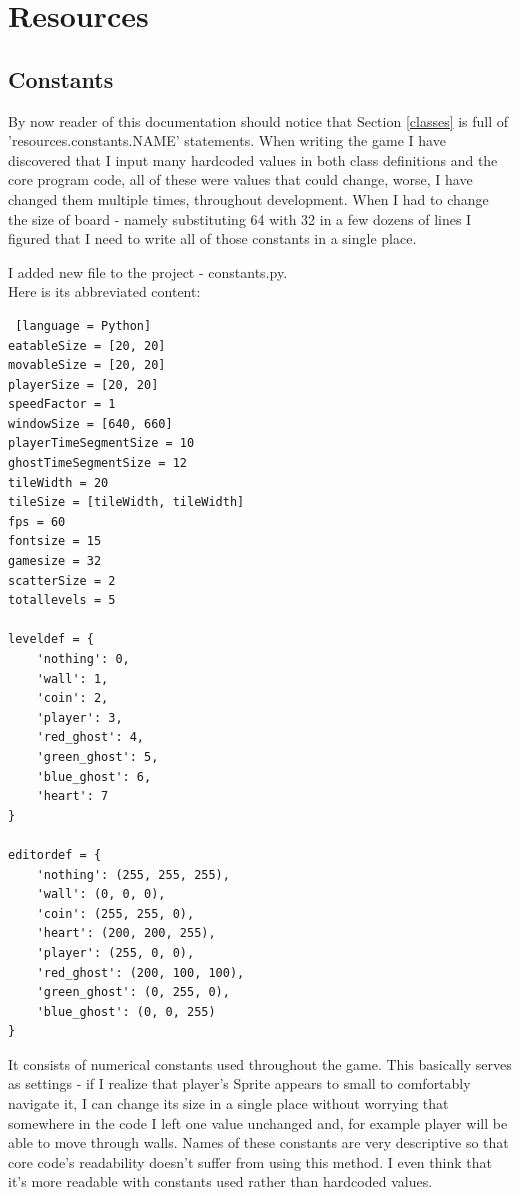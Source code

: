 \documentclass[11pt,a4paper,notitlepage]{report}
\newcommand{\dsubsection}[1]{\FloatBarrier \subsection{#1}}
\begin{document}
		\section{Resources}
			\label{resources}
			\dsubsection{Constants}
				\label{constants}
				By now reader of this documentation should notice that Section \ref{classes} is full of 'resources.constants.NAME' statements. When writing the game I have discovered that I input many hardcoded values in both class definitions and the core program code, all of these were values that could change, worse, I have changed them multiple times, throughout development. When I had to change the size of board - namely substituting 64 with 32 in a few dozens of lines I figured that I need to write all of those constants in a single place.
				
				I added new file to the project - constants.py.\\
				Here is its abbreviated content:
				\begin{lstlisting} [language = Python]
eatableSize = [20, 20]
movableSize = [20, 20]
playerSize = [20, 20]
speedFactor = 1
windowSize = [640, 660]
playerTimeSegmentSize = 10
ghostTimeSegmentSize = 12
tileWidth = 20
tileSize = [tileWidth, tileWidth]
fps = 60
fontsize = 15
gamesize = 32
scatterSize = 2
totallevels = 5

leveldef = {
	'nothing': 0,
	'wall': 1,
	'coin': 2,
	'player': 3,
	'red_ghost': 4,
	'green_ghost': 5,
	'blue_ghost': 6,
	'heart': 7
}

editordef = {
	'nothing': (255, 255, 255),
	'wall': (0, 0, 0),
	'coin': (255, 255, 0),
	'heart': (200, 200, 255),
	'player': (255, 0, 0),
	'red_ghost': (200, 100, 100),
	'green_ghost': (0, 255, 0),
	'blue_ghost': (0, 0, 255)
}
				\end{lstlisting}
				It consists of numerical constants used throughout the game. This basically serves as settings - if I realize that player's Sprite appears to small to comfortably navigate it, I can change its size in a single place without worrying that somewhere in the code I left one value unchanged and, for example player will be able to move through walls. Names of these constants are very descriptive so that core code's readability doesn't suffer from using this method. I even think that it's more readable with constants used rather than hardcoded values.
\end{document}
